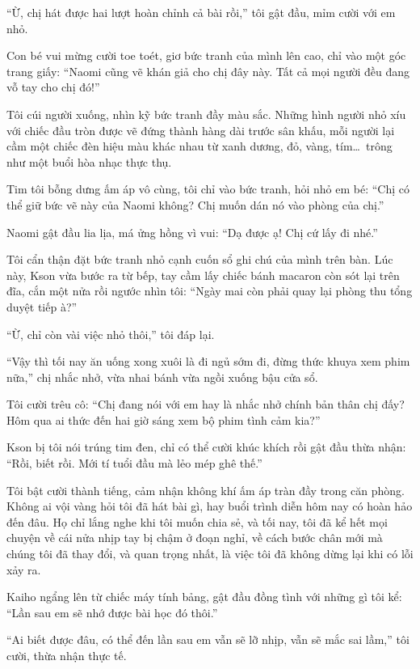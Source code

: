﻿\documentclass[../main.tex]{subfiles}
\begin{document}
``Ừ, chị hát được hai lượt hoàn chỉnh cả bài rồi,'' tôi gật đầu, mỉm cười với em nhỏ.

Con bé vui mừng cười toe toét, giơ bức tranh của mình lên cao, chỉ vào một góc trang giấy: ``Naomi cũng vẽ khán giả cho chị đây này. Tất cả mọi người đều đang vỗ tay cho chị đó!''

Tôi cúi người xuống, nhìn kỹ bức tranh đầy màu sắc. Những hình người nhỏ xíu với chiếc đầu tròn được vẽ đứng thành hàng dài trước sân khấu, mỗi người lại cầm một chiếc đèn hiệu màu khác nhau từ xanh dương, đỏ, vàng, tím\dots\ trông như một buổi hòa nhạc thực thụ.

Tim tôi bỗng dưng ấm áp vô cùng, tôi chỉ vào bức tranh, hỏi nhỏ em bé: ``Chị có thể giữ bức vẽ này của Naomi không? Chị muốn dán nó vào phòng của chị.''

Naomi gật đầu lia lịa, má ửng hồng vì vui: ``Dạ được ạ! Chị cứ lấy đi nhé.''

Tôi cẩn thận đặt bức tranh nhỏ cạnh cuốn sổ ghi chú của mình trên bàn. Lúc này, Kson vừa bước ra từ bếp, tay cầm lấy chiếc bánh macaron còn sót lại trên đĩa, cắn một nửa rồi ngước nhìn tôi: ``Ngày mai còn phải quay lại phòng thu tổng duyệt tiếp à?''

``Ừ, chỉ còn vài việc nhỏ thôi,'' tôi đáp lại.

``Vậy thì tối nay ăn uống xong xuôi là đi ngủ sớm đi, đừng thức khuya xem phim nữa,'' chị nhắc nhở, vừa nhai bánh vừa ngồi xuống bậu cửa sổ.

Tôi cười trêu cô: ``Chị đang nói với em hay là nhắc nhở chính bản thân chị đấy? Hôm qua ai thức đến hai giờ sáng xem bộ phim tình cảm kia?''

Kson bị tôi nói trúng tim đen, chỉ có thể cười khúc khích rồi gật đầu thừa nhận: ``Rồi, biết rồi. Mới tí tuổi đầu mà lẻo mép ghê thế.''

Tôi bật cười thành tiếng, cảm nhận không khí ấm áp tràn đầy trong căn phòng. Không ai vội vàng hỏi tôi đã hát bài gì, hay buổi trình diễn hôm nay có hoàn hảo đến đâu. Họ chỉ lắng nghe khi tôi muốn chia sẻ, và tối nay, tôi đã kể hết mọi chuyện về cái nửa nhịp tay bị chậm ở đoạn nghỉ, về cách bước chân mới mà chúng tôi đã thay đổi, và quan trọng nhất, là việc tôi đã không dừng lại khi có lỗi xảy ra.

Kaiho ngẩng lên từ chiếc máy tính bảng, gật đầu đồng tình với những gì tôi kể: ``Lần sau em sẽ nhớ được bài học đó thôi.''

``Ai biết được đâu, có thể đến lần sau em vẫn sẽ lỡ nhịp, vẫn sẽ mắc sai lầm,'' tôi cười, thừa nhận thực tế.
\end{document}
